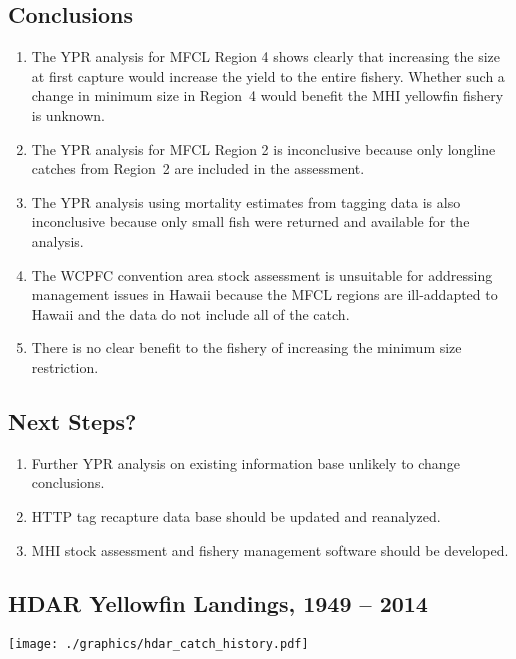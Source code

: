 \documentclass[a4paper,KOMA,landscape,titlepage]{powersem}
\begin{document}
\begin{slide}\section{Conclusions}
\begin{enumerate}
\item The YPR analysis for MFCL Region 4 shows clearly that increasing
the size at first capture would increase the yield to the entire fishery.
Whether such a change in minimum size in Region~4 would
benefit the MHI yellowfin fishery is unknown.

\item The YPR analysis for MFCL Region 2 is inconclusive because only
longline catches from Region~2 are included in the assessment.

\item The YPR analysis using mortality estimates from tagging data is
also inconclusive because only small fish were returned and
available for the analysis. 

\item The WCPFC convention area stock assessment is unsuitable for
addressing management issues in Hawaii because the
MFCL regions are ill-addapted to Hawaii and the data do not include
all of the catch.

\item There is no clear benefit to the fishery of increasing the
minimum size restriction.
\end{enumerate}
\end{slide}

\begin{slide}\section{Next Steps?}
\begin{enumerate}
\item Further YPR analysis on existing information base unlikely to
change conclusions.

\item HTTP tag recapture data base should be updated and reanalyzed.

\item MHI stock assessment and fishery management software should be
developed.
\end{enumerate}
\end{slide}


\begin{slide}\section{HDAR Yellowfin Landings, 1949 -- 2014}
\begin{center}
\texttt{[image: ./graphics/hdar\_catch\_history.pdf]}
\end{center}
\end{slide}
\end{document}
